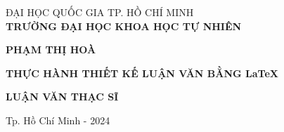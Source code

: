 \begin{titlepage}
\begin{center}
\fontsize{14}{16}\selectfont
{ĐẠI HỌC QUỐC GIA TP. HỒ CHÍ MINH}\\
{\bf TRƯỜNG ĐẠI HỌC KHOA HỌC TỰ NHIÊN}\\
\hfill

\vspace*{2cm}

\fontsize{14}{16}\selectfont
{\bf  PHẠM THỊ HOÀ}

\vspace*{3cm}
\fontsize{16}{18}\selectfont
{\bf THỰC HÀNH THIẾT KẾ LUẬN VĂN BẰNG \LaTeX}

\vspace*{3cm}
\fontsize{14}{16}\selectfont
{\bf LUẬN VĂN THẠC SĨ}


\vfill
\fontsize{12}{16}\selectfont
{Tp. Hồ Chí Minh - 2024}
\end{center}
\end{titlepage}

